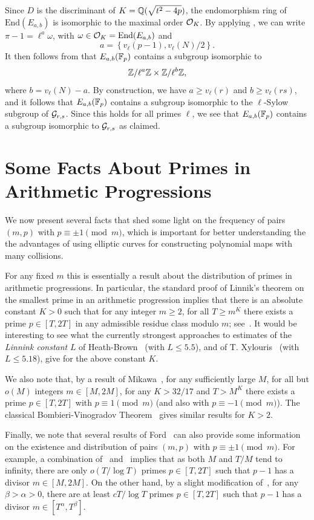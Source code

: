 \documentclass[12pt]{amsart}
\begin{document}
Since $D$ is the discriminant of $K=\mathbb{Q}(\sqrt{t^2-4p})$, the endomorphism ring of~$\mathrm{End}(E_{a,b})$ is
isomorphic to the maximal order ${\mathcal O}_K$.
By applying \cite[Lemma 2]{Ru}, we can write $\pi-1=\ell^a\omega$,
with $\omega\in{\mathcal O}_K=\mathrm{End}(E_{a,b})$ and
$$
a = \left\{v_\ell(p-1),v_\ell(N)/2\right\}.
$$
It then follows from \cite[Lemma 1]{Ru} that $E_{a,b}(\mathbb{F}_p)$ contains a
subgroup isomorphic to
$$
\mathbb{Z}/\ell^a\mathbb{Z}\times \mathbb{Z}/\ell^b\mathbb{Z},
$$
where $b=v_\ell(N)-a$.
By construction, we have $a\ge v_\ell(r)$ and $b\ge v_\ell(rs)$,
and it follows that $E_{a,b}(\mathbb{F}_p)$ contains a subgroup isomorphic to the
$\ell$-Sylow subgroup of ${\mathcal G}_{r,s}$.
Since this holds for all primes $\ell$, we see that
$E_{a,b}(\mathbb{F}_p)$ contains a subgroup isomorphic to ${\mathcal G}_{r,s}$ as claimed.


\section{Some Facts About Primes in Arithmetic Progressions}



We now present several facts that shed some light on the 
frequency of pairs $(m,p)$ with $p \equiv \pm 1 \pmod m$,
which is important for better understanding the the advantages
of using elliptic curves for constructing polynomial maps with 
many collisions. 

For any fixed $m$ this is essentially a 
result about the distribution of primes in 
arithmetic progressions. In particular, the standard proof 
of Linnik's theorem on the smallest prime in an arithmetic 
progression implies that there is an absolute constant 
$K> 0$ such that  for any integer $m\ge 2$, for all $T \ge m^K$ 
there exists a prime $p\in [T,2T]$ in any admissible residue
class modulo $m$; see~\cite[Theorem~18.6]{IwKow}. 
It would be interesting to see what 
the currently strongest  approaches to estimates 
of the {\it Linnink constant\/} $L$ of Heath-Brown~\cite{H-B}
(with $L \le 5.5$), and of 
T. Xylouris~\cite{Xyl} (with $L \le 5.18$), give for the
above constant $K$.

We also note that, by a result of Mikawa~\cite{Mik}, for any
sufficiently large $M$, for all but $o(M)$ integers 
$m \in [M,2M]$, for any $K > 32/17$ and $T > M^K$  
there exists a prime $p\in [T,2T]$ with  $p\equiv 1 \pmod m$ 
(and also with $p\equiv -1 \pmod m$). The classical 
Bombieri-Vinogradov Theorem~\cite[Theorem~17.1]{IwKow}
gives similar results for $K > 2$. 

Finally, we note that several results of  Ford~\cite{Ford}
can also provide some information on the existence and distribution
of pairs $(m,p)$ with $p \equiv \pm 1 \pmod m$. 
For example, a combination of~\cite[Corollary~2]{Ford}
and~\cite[Theorem~6]{Ford} implies that as both $M$ and $T/M$ tend to infinity,
there are only $o(T/\log T)$ primes $p \in [T,2T]$ such that 
$p-1$ has a divisor $m \in [M,2M]$. On the other hand, by a 
slight modification of~\cite[Theorem~7]{Ford}, 
for any $\beta> \alpha>0$, there are at least $cT/\log T$
primes  $p \in [T,2T]$ such that 
$p-1$ has a divisor $m \in [T^\alpha,T^\beta]$.
\end{document}
